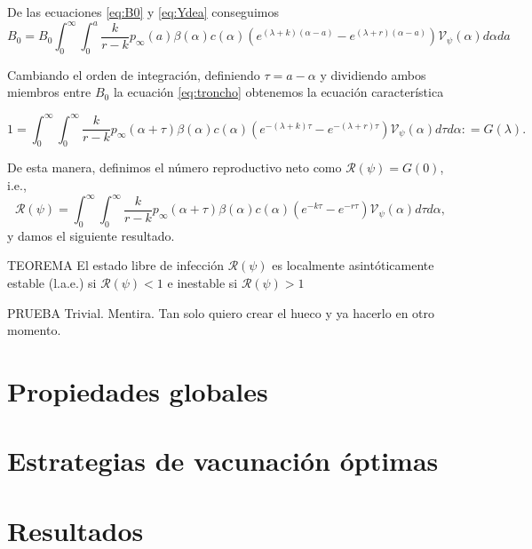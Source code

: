 \documentclass[
]{book}
\begin{document}
De las ecuaciones \eqref{eq:B0} y \eqref{eq:Ydea} conseguimos
\begin{equation}
B_0 = B_0 \int_0^\infty \int_0^a 
\frac{k}{r-k} p_\infty (a) \beta(\alpha) c(\alpha) 
\left(  
e^{(\lambda + k)(\alpha - a)} - 
e^{(\lambda + r)(\alpha - a)}
\right)
\mathscr{V}_\psi (\alpha) 
d \alpha da
\label{eq:troncho}
\end{equation}

Cambiando el orden de integración, definiendo \(\tau = a - \alpha\) y dividiendo ambos miembros entre \(B_0\) la ecuación \eqref{eq:troncho} obtenemos la ecuación característica

\begin{equation}
1 = \int_0^\infty \int_0^\infty 
\frac{k}{r-k} p_\infty (\alpha + \tau) \beta(\alpha) c(\alpha) 
\left(  
e^{-(\lambda + k) \tau} - 
e^{-(\lambda + r) \tau}
\right)
\mathscr{V}_\psi (\alpha) 
d \tau  d \alpha
: = G(\lambda).
\label{eq:troncho2}
\end{equation}

De esta manera, definimos el número reproductivo neto como \(\mathscr{R}(\psi) = G(0)\), i.e.,
\begin{equation}
\mathscr{R}(\psi) = 
\int_0^\infty \int_0^\infty 
\frac{k}{r-k} p_\infty (\alpha + \tau) \beta(\alpha) c(\alpha) 
\left(  
e^{-k \tau} - 
e^{-r \tau}
\right)
\mathscr{V}_\psi (\alpha) 
d \tau  d \alpha,
\label{eq:Rdepsi}
\end{equation}
y damos el siguiente resultado.

TEOREMA
El estado libre de infección \(\mathscr{R}(\psi)\) es localmente asintóticamente estable (l.a.e.) si \(\mathscr{R}(\psi) < 1\) e inestable si \(\mathscr{R}(\psi) > 1\)

PRUEBA
Trivial. Mentira. Tan solo quiero crear el hueco y ya hacerlo en otro momento.

\hypertarget{sec4}{%
\section{Propiedades globales}\label{sec4}}

\hypertarget{sec5}{%
\section{Estrategias de vacunación óptimas}\label{sec5}}

\hypertarget{sec6}{%
\section{Resultados}\label{sec6}}
\end{document}
